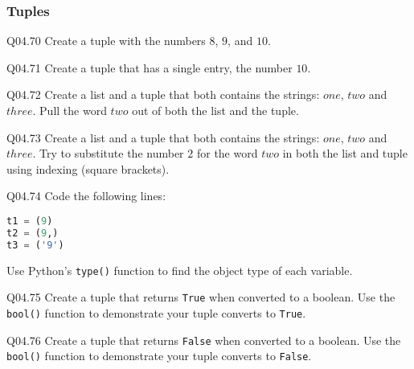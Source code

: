 \documentclass{book}
\newcommand{\passthrough}[1]{#1}
\begin{document}
    
        \hypertarget{tuples}{%
\subsubsection{Tuples}\label{tuples}}

Q04.70 Create a tuple with the numbers \(8\), \(9\), and \(10\).

Q04.71 Create a tuple that has a single entry, the number \(10\).

Q04.72 Create a list and a tuple that both contains the strings:
\(one\), \(two\) and \(three\). Pull the word \(two\) out of both the
list and the tuple.

Q04.73 Create a list and a tuple that both contains the strings:
\(one\), \(two\) and \(three\). Try to substitute the number \(2\) for
the word \(two\) in both the list and tuple using indexing (square
brackets).

Q04.74 Code the following lines:

\begin{lstlisting}[language=Python]
t1 = (9)
t2 = (9,)
t3 = ('9')
\end{lstlisting}

Use Python's \passthrough{\lstinline!type()!} function to find the
object type of each variable.

Q04.75 Create a tuple that returns \passthrough{\lstinline!True!} when
converted to a boolean. Use the \passthrough{\lstinline!bool()!}
function to demonstrate your tuple converts to
\passthrough{\lstinline!True!}.

Q04.76 Create a tuple that returns \passthrough{\lstinline!False!} when
converted to a boolean. Use the \passthrough{\lstinline!bool()!}
function to demonstrate your tuple converts to
\passthrough{\lstinline!False!}.
    
\end{document}
